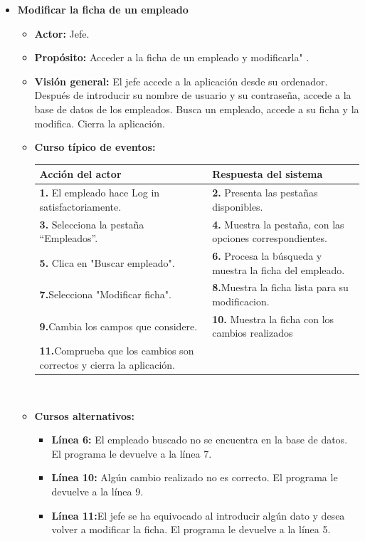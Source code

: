 \documentclass[spanish,a4paper,12pt]{report}		%
\begin{document}
\begin{itemize}

	\item \textbf{Modificar la ficha de un empleado}		
			\begin{itemize}
			\item \textbf{Actor:} Jefe.
			\item \textbf{Propósito: } Acceder a la ficha de un empleado y modificarla" .
			\item \textbf{Visión general:} El jefe accede a la aplicación desde su ordenador. Después de introducir su nombre de usuario y su contraseña, accede a la base de datos de los empleados. Busca un empleado, accede a su ficha y la modifica. Cierra la aplicación. 
	\newpage
			\item \textbf{Curso típico de eventos:} 	\\
				\begin{tabular}{|p{6cm}||p{6cm}|}
				\hline
				\textbf{Acción del actor} & \textbf{Respuesta del sistema} \\ \hline \hline
				\textbf{1.}   El empleado hace Log in satisfactoriamente. & \textbf{2.} Presenta las pestañas disponibles.\\ \hline
				\textbf{3.} Selecciona la pestaña “Empleados”. & \textbf{4.} Muestra la pestaña, con las opciones correspondientes. \\ \hline
				\textbf{5.} Clica en "Buscar empleado".	& \textbf{6.} Procesa la búsqueda y muestra la ficha del empleado. \\ \hline
				\textbf{7.}Selecciona "Modificar ficha". & \textbf{8.}Muestra la ficha lista para su modificacion.\\ \hline
				\textbf{9.}Cambia los campos que considere. & \textbf{10.} Muestra la ficha con los cambios realizados \\ \hline
				\textbf{11.}Comprueba que los cambios son correctos y cierra la aplicación. & \textbf{} \\ \hline
			\end{tabular}
			\\
			\item \textbf{Cursos alternativos:} 
			\begin{itemize}
			\item  \textbf{Línea 6:} El empleado buscado no se encuentra en la base de datos. El programa le devuelve a la línea 7.
			\item  \textbf{Línea 10:} Algún cambio realizado no es correcto. El programa le devuelve a la línea 9.
			\item  \textbf{Línea 11:}El jefe se ha equivocado al introducir algún dato y desea volver a modificar la ficha. El programa le devuelve a la línea 5.
			

\end{itemize}
\end{itemize}
\end{itemize}
\end{document}
